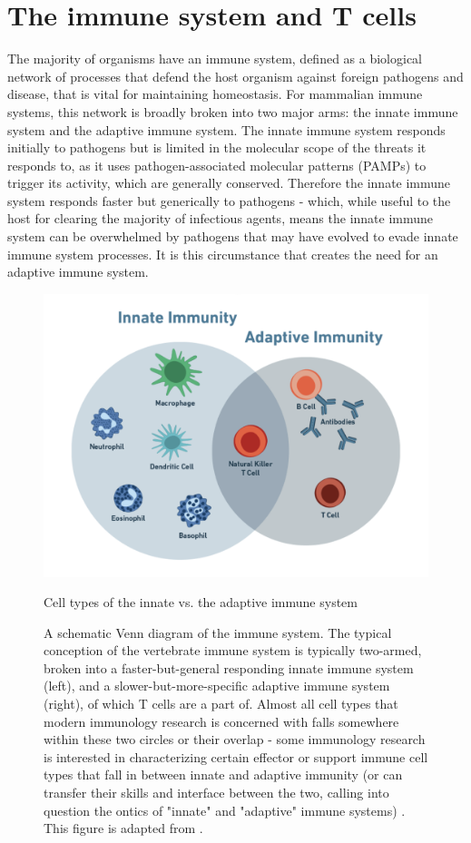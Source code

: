 \section{The immune system and T cells}
The majority of organisms have an immune system, defined as a biological network of processes that defend the host organism against foreign pathogens and disease, that is vital for maintaining homeostasis. For mammalian immune systems, this network is broadly broken into two major arms: the innate immune system and the adaptive immune system. The innate immune system responds initially to pathogens but is limited in the molecular scope of the threats it responds to, as it uses pathogen-associated molecular patterns (PAMPs) to trigger its activity, which are generally conserved. Therefore the innate immune system responds faster but generically to pathogens - which, while useful to the host for clearing the majority of infectious agents, means the innate immune system can be overwhelmed by pathogens that may have evolved to evade innate immune system processes. It is this circumstance that creates the need for an adaptive immune system.

\begin{figure}[htbp]
	\centering
	\includegraphics[width=\textwidth]{../figures/chapter1/innateadaptiveimmunesystem.png}
	\caption{Cell types of the innate vs. the adaptive immune system}
	\caption*{A schematic Venn diagram of the immune system. The typical conception of the vertebrate immune system is typically two-armed, broken into a faster-but-general responding innate immune system (left), and a slower-but-more-specific adaptive immune system (right), of which T cells are a part of.  Almost all cell types that modern immunology research is concerned with falls somewhere within these two circles or their overlap - some immunology research is interested in characterizing certain effector or support immune cell types that fall in between innate and adaptive immunity (or can transfer their skills and interface between the two, calling into question the ontics of "innate" and "adaptive" immune systems) \cite{Heidegger1962}. This figure is adapted from \cite{Alam2007}.}
	\label{fig:innateadaptiveimmunesystem}
\end{figure}

